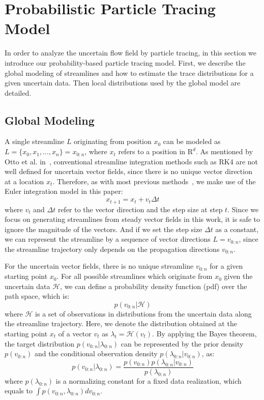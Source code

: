 \section{Probabilistic Particle Tracing Model}

In order to analyze the uncertain flow field by particle tracing, in this section we introduce our probability-based particle tracing model. First, we describe the global modeling of streamlines and how to estimate the trace distributions for a given uncertain data. Then local distributions used by the global model are detailed.

\subsection{Global Modeling}

A single streamline $L$ originating from position ${x_0}$ can be modeled as $L = \{ {x_0},{x_1},...,{x_n}\} = {x_{0:n}}$, where $x_t$ refers to a position in $\mathrm{R}^d$. As mentioned by Otto et al. in~\cite{Otto10a, Otto11a}, conventional streamline integration methods such as RK4 are not well defined for uncertain vector fields, since there is no unique vector direction at a location ${x_t}$. Therefore, as with most previous methods~\cite{Otto10a, Otto11a}, we make use of the Euler integration model in this paper:
\begin{equation}
  {x_{t + 1}} = {x_t} + {v_t}\Delta t
\end{equation}
where ${v_t}$ and $\Delta t$ refer to the vector direction and the step size at step $t$. Since we focus on generating streamlines from steady vector fields in this work, it is safe to ignore the magnitude of the vectors. And if we set the step size $\Delta t$ as a constant, we can represent the streamline by a sequence of vector directions ${L = v_{0:n}}$, since the streamline trajectory only depends on the propagation directions $v_{0:n}$.

For the uncertain vector fields, there is no unique streamline $v_{0:n}$ for a given starting point $x_0$. For all possible streamlines which originate from $x_0$ given the uncertain data $\mathcal{H}$, we can define a probability density function (pdf) over the path space, which is:
\begin{equation}
  p(v_{0:n}|\mathcal{H})
\end{equation}
where $\mathcal{H}$ is a set of observations in distributions from the uncertain data along the streamline trajectory. Here, we denote the distribution obtained at the starting point $x_t$ of a vector $v_t$ as $\lambda_t=\mathcal{H}(v_t)$. By applying the Bayes theorem, the target distribution $p({v_{0:n}}|{\lambda_{0:n}})$ can be represented by the prior density $p({v_{0:n}})$ and the conditional observation density $p({\lambda_{0:n}}|{v_{0:n}})$, as:
\begin{equation}
  p({v_{0:n}}|{\lambda_{0:n}}) = \frac{{p({v_{0:n}})p({\lambda_{0:n}}|{v_{0:n}})}}{{p({\lambda_{0:n}})}}
\end{equation}
where ${p({\lambda_{0:n}})}$ is a normalizing constant for a fixed data realization, which equals to $\int {p({v_{0:n}},{\lambda_{0:n}})} d{v_{0:n}}$.


